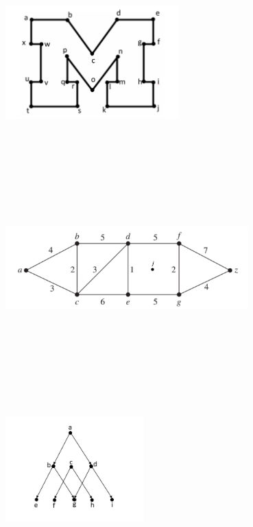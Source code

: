 \documentclass[12pt]{exam}
\begin{document}
\begin{solution}
    \begin{qparts}
        \item 
        ~\\ \includegraphics[width=0.5\textwidth]{pointy_m.JPG}
        ~\\~\\~\\~\\~\\~\\~\\
        \item
        ~\\ \includegraphics[width=0.7\textwidth]{weighted_graph.JPG}
        ~\\~\\~\\~\\~\\~\\~\\
        \item 
        ~\\ \includegraphics[width=0.4\textwidth]{tree.JPG}
        ~\\~\\~\\~\\~\\~\\~\\
    \end{qparts}
\end{solution}
\end{document}
